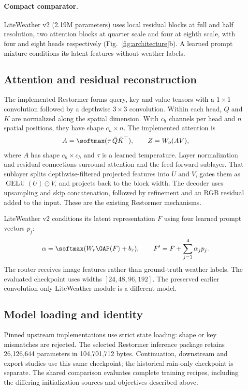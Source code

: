\paragraph{Compact comparator.}
LiteWeather v2 (2.19M parameters) uses local residual blocks at full and
half resolution, two attention blocks at quarter scale and four at eighth
scale, with four and eight heads respectively (Fig.~\ref{fig:architecture}b).
A learned prompt mixture conditions its latent features without weather labels.

\subsection{Attention and residual reconstruction}
The implemented Restormer forms query, key and value tensors with a
$1\times1$ convolution followed by a depthwise $3\times3$ convolution.
Within each head, $Q$ and $K$ are normalized along the spatial dimension.
With $c_h$ channels per head and $n$ spatial positions, they have shape
$c_h\times n$. The implemented attention is
\begin{equation}
 A=\softmax(\tau\,\bar Q\bar K^\top),\qquad
 Z=W_o(AV),
\end{equation}
where $A$ has shape $c_h\times c_h$ and $\tau$ is a learned temperature.
Layer normalization and residual connections surround attention and the
feed-forward sublayer. That sublayer splits depthwise-filtered projected
features into $U$ and $V$, gates them as $\operatorname{GELU}(U)\odot V$,
and projects back to the block width. The decoder uses upsampling and skip
concatenation, followed by refinement and an RGB residual added to the input.
These are the existing Restormer mechanisms.

LiteWeather v2 conditions its latent representation $F$ using four learned
prompt vectors $p_j$:
\begin{equation}
 \alpha=\softmax(W_r\GAP(F)+b_r),\qquad
 F'=F+\sum_{j=1}^{4}\alpha_jp_j.
\end{equation}
The router receives image features rather than ground-truth weather labels.
The evaluated checkpoint uses widths $[24,48,96,192]$. The preserved earlier
convolution-only LiteWeather module is a different model.

\subsection{Model loading and identity}
Pinned upstream implementations use strict state loading: shape or key
mismatches are rejected. The selected Restormer inference package retains
26,126,644 parameters in 104,701,712 bytes. Continuation, downstream and export
studies use this same checkpoint; the historical rain-only checkpoint is
separate. The shared comparison evaluates complete training recipes, including
the differing initialization sources and objectives described above.

